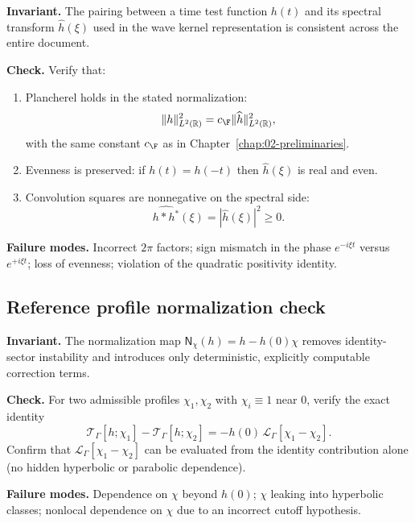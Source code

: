 \begin{audit}
\label{audit:E.A1}
\textbf{Invariant.} The pairing between a time test function $h(t)$ and its spectral transform
$\widehat{h}(\xi)$ used in the wave kernel representation is consistent across the entire document.

\textbf{Check.} Verify that:
\begin{enumerate}
\item Plancherel holds in the stated normalization:
\[
\|h\|_{L^2(\R)}^2 = c_\F \|\widehat{h}\|_{L^2(\R)}^2,
\]
with the same constant $c_\F$ as in Chapter~\ref{chap:02-preliminaries}.
\item Evenness is preserved:
if $h(t)=h(-t)$ then $\widehat{h}(\xi)$ is real and even.
\item Convolution squares are nonnegative on the spectral side:
\[
\widehat{h*h^\ast}(\xi)=|\widehat{h}(\xi)|^2\ge 0.
\]
\end{enumerate}

\textbf{Failure modes.} Incorrect $2\pi$ factors; sign mismatch in the phase $e^{-i\xi t}$ versus $e^{+i\xi t}$; loss of
evenness; violation of the quadratic positivity identity.
\end{audit}

\subsection{Reference profile normalization check}
\label{subsec:E.reference}

\begin{audit}
\label{audit:E.A2}
\textbf{Invariant.} The normalization map $\mathsf{N}_\chi(h)=h-h(0)\chi$ removes identity-sector instability and
introduces only deterministic, explicitly computable correction terms.

\textbf{Check.} For two admissible profiles $\chi_1,\chi_2$ with $\chi_i\equiv 1$ near $0$, verify the exact identity
\[
\mathcal{T}_\Gamma[h;\chi_1]-\mathcal{T}_\Gamma[h;\chi_2]
=
-h(0)\,\mathcal{L}_\Gamma[\chi_1-\chi_2].
\]
Confirm that $\mathcal{L}_\Gamma[\chi_1-\chi_2]$ can be evaluated from the identity contribution alone (no hidden
hyperbolic or parabolic dependence).

\textbf{Failure modes.} Dependence on $\chi$ beyond $h(0)$; $\chi$ leaking into hyperbolic classes; nonlocal dependence
on $\chi$ due to an incorrect cutoff hypothesis.
\end{audit}


